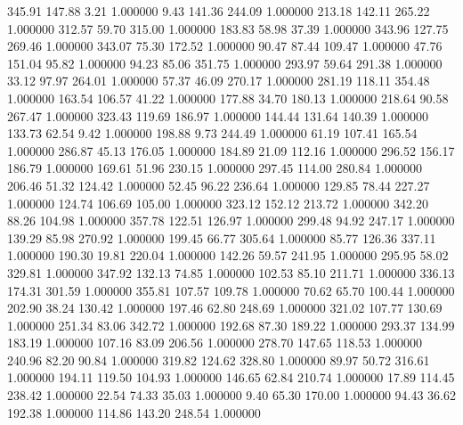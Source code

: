     345.91    147.88      3.21  1.000000
      9.43    141.36    244.09  1.000000
    213.18    142.11    265.22  1.000000
    312.57     59.70    315.00  1.000000
    183.83     58.98     37.39  1.000000
    343.96    127.75    269.46  1.000000
    343.07     75.30    172.52  1.000000
     90.47     87.44    109.47  1.000000
     47.76    151.04     95.82  1.000000
     94.23     85.06    351.75  1.000000
    293.97     59.64    291.38  1.000000
     33.12     97.97    264.01  1.000000
     57.37     46.09    270.17  1.000000
    281.19    118.11    354.48  1.000000
    163.54    106.57     41.22  1.000000
    177.88     34.70    180.13  1.000000
    218.64     90.58    267.47  1.000000
    323.43    119.69    186.97  1.000000
    144.44    131.64    140.39  1.000000
    133.73     62.54      9.42  1.000000
    198.88      9.73    244.49  1.000000
     61.19    107.41    165.54  1.000000
    286.87     45.13    176.05  1.000000
    184.89     21.09    112.16  1.000000
    296.52    156.17    186.79  1.000000
    169.61     51.96    230.15  1.000000
    297.45    114.00    280.84  1.000000
    206.46     51.32    124.42  1.000000
     52.45     96.22    236.64  1.000000
    129.85     78.44    227.27  1.000000
    124.74    106.69    105.00  1.000000
    323.12    152.12    213.72  1.000000
    342.20     88.26    104.98  1.000000
    357.78    122.51    126.97  1.000000
    299.48     94.92    247.17  1.000000
    139.29     85.98    270.92  1.000000
    199.45     66.77    305.64  1.000000
     85.77    126.36    337.11  1.000000
    190.30     19.81    220.04  1.000000
    142.26     59.57    241.95  1.000000
    295.95     58.02    329.81  1.000000
    347.92    132.13     74.85  1.000000
    102.53     85.10    211.71  1.000000
    336.13    174.31    301.59  1.000000
    355.81    107.57    109.78  1.000000
     70.62     65.70    100.44  1.000000
    202.90     38.24    130.42  1.000000
    197.46     62.80    248.69  1.000000
    321.02    107.77    130.69  1.000000
    251.34     83.06    342.72  1.000000
    192.68     87.30    189.22  1.000000
    293.37    134.99    183.19  1.000000
    107.16     83.09    206.56  1.000000
    278.70    147.65    118.53  1.000000
    240.96     82.20     90.84  1.000000
    319.82    124.62    328.80  1.000000
     89.97     50.72    316.61  1.000000
    194.11    119.50    104.93  1.000000
    146.65     62.84    210.74  1.000000
     17.89    114.45    238.42  1.000000
     22.54     74.33     35.03  1.000000
      9.40     65.30    170.00  1.000000
     94.43     36.62    192.38  1.000000
    114.86    143.20    248.54  1.000000
